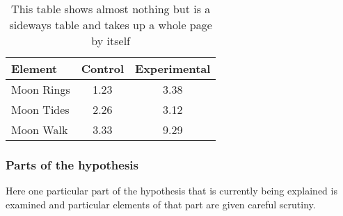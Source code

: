 \begin{landscape}
    \hfill
    \vfill
    \begin{table}[h!] \centering
        \caption{This table shows almost nothing but is a
            sideways table and takes up a whole page by itself}
        \label{nothingelse}
        \begin{tabular}{lcc} \hline
            \textbf{Element} & \textbf{Control} & \textbf{Experimental} \\ \hline
            Moon Rings       & 1.23             & 3.38                  \\
            Moon Tides       & 2.26             & 3.12                  \\
            Moon Walk        & 3.33             & 9.29                  \\ \hline
        \end{tabular}
    \end{table}
    \hfill
    \vfill
\end{landscape}

\subsubsection{Parts of the hypothesis}

Here one particular part of the hypothesis that is
currently being explained is examined and particular
elements of that part are given careful scrutiny.


